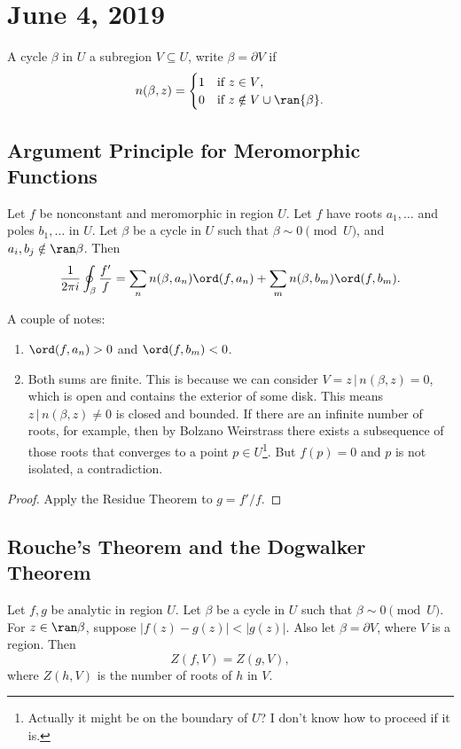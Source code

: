 \section{June 4, 2019}
\begin{definition}
    A cycle $\beta$ in $U$  a subregion $V \subseteq U$,
    write $\beta = \partial V$ if
    \[ n(\beta, z) = 
        \begin{cases} 1 & \text{if $z \in V$}, \\
            0 & \text{if $z \notin V \cup \ran{\beta}$}.
        \end{cases}
        \]
\end{definition}

\subsection{Argument Principle for Meromorphic Functions}
\begin{theorem}
    Let $f$ be nonconstant and meromorphic in region $U$.
    Let $f$ have roots $a_1, \ldots$ and poles $b_1, \ldots$ in $U$.
    Let $\beta$ be a cycle in $U$ such that $\beta \sim 0 \pmod{U}$,
    and $a_i, b_j \notin \ran \beta$.
    Then
    \[ \frac{1}{2\pi i} \oint_{\beta} \frac{f'}{f} = \sum_n n(\beta, a_n)
    \ord (f, a_n) + \sum_{m} n(\beta, b_m) \ord(f, b_m). \]
\end{theorem}
A couple of notes:
\begin{enumerate}
    \item $\ord(f, a_n) > 0$ and $\ord (f, b_m) < 0$.
    \item Both sums are finite.  This is because we can consider
        $V = {z \, | \, n(\beta, z) = 0}$, which is open and contains
        the exterior of some disk.
        This means ${z \, | \, n(\beta, z) \ne 0}$ is closed and bounded.
        If there are an infinite number of roots, for example, then
        by Bolzano Weirstrass there exists a subsequence of those roots
        that converges to a point $p \in U$\footnote{Actually it might be on the boundary of $U$?  I don't know how to proceed if it is.}.  
        But $f(p) = 0$ and $p$
        is not isolated, a contradiction.
\end{enumerate}

\begin{proof}
    Apply the Residue Theorem to $g = f'/f$.
\end{proof}

\subsection{Rouche's Theorem and the Dogwalker Theorem}
\begin{theorem}
    Let $f, g$ be analytic in region $U$.
    Let $\beta$ be a cycle in $U$ such that $\beta \sim 0 \pmod{U}$.
    For $z \in \ran \beta$, suppose $|f(z)-g(z)| < |g(z)|$.
    Also let $\beta = \partial V$, where $V$ is a region.
    Then
    \[ Z(f, V) = Z(g, V), \]
    where $Z(h, V)$ is the number of roots of $h$ in $V$.
\end{theorem}

